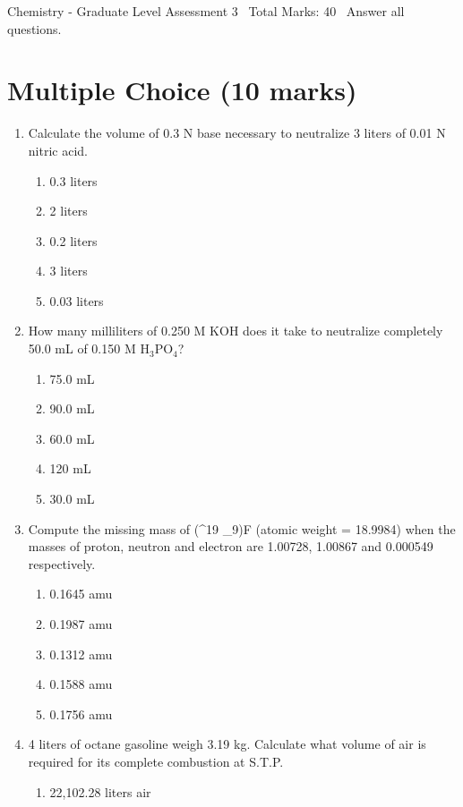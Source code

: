 \documentclass[12pt]{article}
\begin{document}
\begin{center}
Chemistry - Graduate Level Assessment 3 \
Total Marks: 40 \
Answer all questions.
\end{center}

\section*{Multiple Choice (10 marks)}
\begin{enumerate}[label=\arabic*.]
\item Calculate the volume of 0.3 N base necessary to neutralize 3 liters of 0.01 N nitric acid.
\begin{enumerate}[label=(\alph*)]
    \item 0.3 liters
    \item 2 liters
    \item 0.2 liters
    \item 3 liters
    \item 0.03 liters
\end{enumerate}
\item How many milliliters of 0.250 M KOH does it take to neutralize completely 50.0 mL of 0.150 M H$_{3}$PO$_{4}$?
\begin{enumerate}[label=(\alph*)]
    \item 75.0 mL
    \item 90.0 mL
    \item 60.0 mL
    \item 120 mL
    \item 30.0 mL
\end{enumerate}
\item Compute the missing mass of (^19 \_9)F (atomic weight = 18.9984) when the masses of proton, neutron and electron are 1.00728, 1.00867 and 0.000549 respectively.
\begin{enumerate}[label=(\alph*)]
    \item 0.1645 amu
    \item 0.1987 amu
    \item 0.1312 amu
    \item 0.1588 amu
    \item 0.1756 amu
\end{enumerate}
\item 4 liters of octane gasoline weigh 3.19 kg. Calculate what volume of air is required for its complete combustion at S.T.P.
\begin{enumerate}[label=(\alph*)]
    \item 22,102.28 liters air

\end{enumerate}
\end{enumerate}
\end{document}
